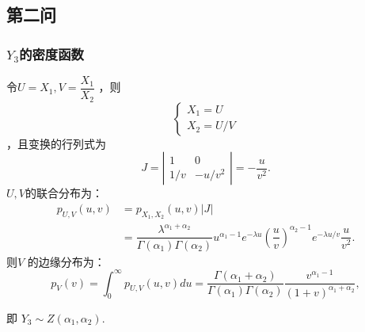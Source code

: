 \subsection{第二问}
\begin{frame}[t,allowframebreaks]
    \frametitle{$Y_3$的密度函数}
        令$ U=X_1,V=\dfrac{X_1}{X_2}$ ，则 
        \[
            \left\{ \begin{array}{ll} X_{1}=U \\ X_{2}=U/V \end{array}\right.
        \]
        ，且变换的行列式为 
        \[
            J= \left | \begin{array}{ccc} 1 & 0 \\ 1/v & -u/v^2 \end{array} \right |=-\dfrac{u}{v^2}.
        \]
        $U,V $的联合分布为： 
        \[
            \begin{aligned} p_{U,V}(u,v)&=p_{X_1,X_2}(u,v)|J| \\ &=\dfrac{\lambda^{\alpha_1+\alpha_2}}{\Gamma(\alpha_1)\Gamma(\alpha_2)}u^{\alpha_1-1}e^{-\lambda u} \left(\dfrac{u}{v} \right)^{\alpha_2-1}e^{-\lambda u/v }\dfrac{u}{v^2}. \end{aligned}
        \]
        则$ V$ 的边缘分布为： 
        \[
            p_{V}(v)=\int_{0}^{\infty} p_{U,V}(u,v)du=\dfrac{\Gamma(\alpha_1+\alpha_2)}{\Gamma(\alpha_1)\Gamma(\alpha_2)}\dfrac{v^{\alpha_1-1}}{(1+v)^{\alpha_1+\alpha_2}},
        \]

        即 $Y_3 \sim Z(\alpha_1,\alpha_2) .$
\end{frame}
